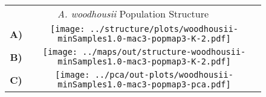 \documentclass[border=10pt,varwidth=30cm]{standalone}
\begin{document}
\begin{figure}
\begin{tabular}[t]{cc}
    \multicolumn{2}{c}{\Large \textit{A. woodhousii} Population Structure} \\
  {\textbf{\large A)}} & \texttt{[image: ../structure/plots/woodhousii-minSamples1.0-mac3-popmap3-K-2.pdf]} \\ \vspace{1mm}
  {\textbf{\large B)}} & \texttt{[image: ../maps/out/structure-woodhousii-minSamples1.0-mac3-popmap3-K-2.pdf]} \\
  {\textbf{\large C)}} & \texttt{[image: ../pca/out-plots/woodhousii-minSamples1.0-mac3-popmap3-pca.pdf]} \\
\end{tabular}
\end{figure}
\end{document}
